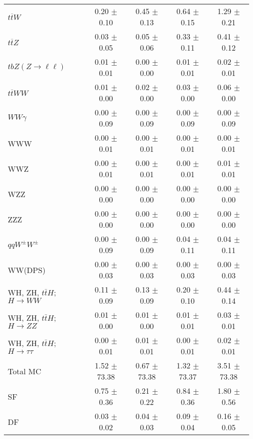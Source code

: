 \begin{tabular}{l|cccc}
                   $t\overline{t}W$ &  0.20 $\pm$  0.10 &  0.45 $\pm$  0.13 &  0.64 $\pm$  0.15 &  1.29 $\pm$  0.21 \\
                   $t\overline{t}Z$ &  0.03 $\pm$  0.05 &  0.05 $\pm$  0.06 &  0.33 $\pm$  0.11 &  0.41 $\pm$  0.12 \\
    $tbZ (Z \rightarrow \ell \ell)$ &  0.01 $\pm$  0.01 &  0.00 $\pm$  0.00 &  0.01 $\pm$  0.01 &  0.02 $\pm$  0.01 \\
                  $t\overline{t}WW$ &  0.01 $\pm$  0.00 &  0.02 $\pm$  0.00 &  0.03 $\pm$  0.00 &  0.06 $\pm$  0.00 \\
                         $WW\gamma$ &  0.00 $\pm$  0.09 &  0.00 $\pm$  0.09 &  0.00 $\pm$  0.09 &  0.00 $\pm$  0.09 \\
                                WWW &  0.00 $\pm$  0.01 &  0.00 $\pm$  0.01 &  0.00 $\pm$  0.01 &  0.00 $\pm$  0.01 \\
                                WWZ &  0.00 $\pm$  0.01 &  0.00 $\pm$  0.01 &  0.00 $\pm$  0.01 &  0.01 $\pm$  0.01 \\
                                WZZ &  0.00 $\pm$  0.00 &  0.00 $\pm$  0.00 &  0.00 $\pm$  0.00 &  0.00 $\pm$  0.00 \\
                                ZZZ &  0.00 $\pm$  0.00 &  0.00 $\pm$  0.00 &  0.00 $\pm$  0.00 &  0.00 $\pm$  0.00 \\
                 $qqW^{\pm}W^{\pm}$ &  0.00 $\pm$  0.09 &  0.00 $\pm$  0.09 &  0.04 $\pm$  0.11 &  0.04 $\pm$  0.11 \\
                            WW(DPS) &  0.00 $\pm$  0.03 &  0.00 $\pm$  0.03 &  0.00 $\pm$  0.03 &  0.00 $\pm$  0.03 \\
WH, ZH, $t\bar{t}H$; $H \rightarrow WW$ &  0.11 $\pm$  0.09 &  0.13 $\pm$  0.09 &  0.20 $\pm$  0.10 &  0.44 $\pm$  0.14 \\
WH, ZH, $t\bar{t}H$; $H \rightarrow ZZ$ &  0.01 $\pm$  0.00 &  0.01 $\pm$  0.00 &  0.01 $\pm$  0.01 &  0.03 $\pm$  0.01 \\
WH, ZH, $t\bar{t}H$; $H \rightarrow \tau\tau$ &  0.00 $\pm$  0.01 &  0.01 $\pm$  0.01 &  0.00 $\pm$  0.01 &  0.02 $\pm$  0.01 \\
\hline\hline
                           Total MC &  1.52 $\pm$ 73.38 &  0.67 $\pm$ 73.38 &  1.32 $\pm$ 73.37 &  3.51 $\pm$ 73.38 \\
\hline
                                 SF &  0.75 $\pm$  0.36 &  0.21 $\pm$  0.22 &  0.84 $\pm$  0.36 &  1.80 $\pm$  0.56 \\
                                 DF &  0.03 $\pm$  0.02 &  0.04 $\pm$  0.03 &  0.09 $\pm$  0.04 &  0.16 $\pm$  0.05 \\

\end{tabular}
